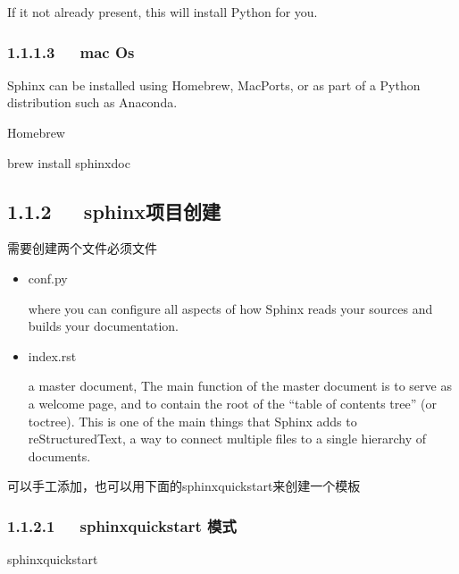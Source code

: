 \documentclass[letterpaper,12pt,english]{sphinxmanual}
\begin{document}
If it not already present, this will install Python for you.


\subsubsection{1.1.1.3   mac Os}
\label{\detokenize{001software/001install/sphinx:mac-os}}
Sphinx can be installed using Homebrew, MacPorts, or as part of a Python distribution such as Anaconda.

Homebrew

\begin{sphinxVerbatim}[commandchars=\\\{\}]
\PYGZdl{} brew install sphinx\PYGZhy{}doc
\end{sphinxVerbatim}


\subsection{1.1.2   sphinx项目创建}
\label{\detokenize{001software/001install/sphinx:id2}}

需要创建两个文件必须文件
\begin{itemize}
\item {} 
conf.py

where you can configure all aspects of how Sphinx reads your sources and builds your documentation.

\item {} 
index.rst

a master document, The main function of the master document is to serve as a welcome page, and to contain the root of the “table of contents tree” (or toctree). This is one of the main things that Sphinx adds to reStructuredText, a way to connect multiple files to a single hierarchy of documents.

\end{itemize}

可以手工添加，也可以用下面的sphinx\sphinxhyphen{}quickstart来创建一个模板


\subsubsection{1.1.2.1   sphinx\sphinxhyphen{}quickstart 模式}
\label{\detokenize{001software/001install/sphinx:sphinx-quickstart}}
\begin{sphinxVerbatim}[commandchars=\\\{\}]
\PYGZdl{} sphinx\PYGZhy{}quickstart
\end{sphinxVerbatim}
\end{document}
